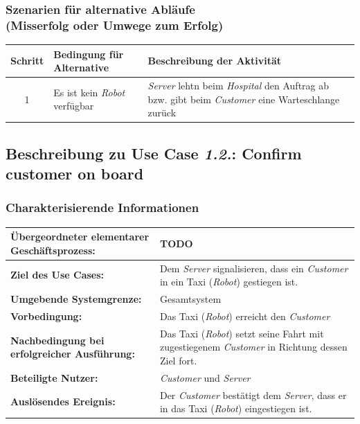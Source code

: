 			\subsubsection*{Szenarien für alternative Abläufe\\ (Misserfolg oder Umwege zum Erfolg)}	
					
			\begin{table}[H]
					\centering
					\begin{tabularx}{\textwidth}{|c|p{2cm}|X|}
					\hline
					Schritt & Bedingung für Alternative & Beschreibung der Aktivität \\ \hline
					1 & Es ist kein \emph{Robot} verfügbar & \emph{Server} lehtn beim \emph{Hospital} den Auftrag ab bzw. gibt beim \emph{Customer} eine Warteschlange zurück \\
					\hline
					\end{tabularx}
				\end{table}
				
				
			
			
		
			
			\pagebreak
	
			\subsection*{Beschreibung zu Use Case \emph{1.2.}: Confirm customer on board}
				\subsubsection*{Charakterisierende Informationen}
				
				\begin{table}[H]
					\centering
					\begin{tabularx}{\textwidth}{|p{5cm}|X|}
						\hline
						\textbf{Übergeordneter elementarer Geschäftsprozess:} & TODO  \\ \hline
						\textbf{Ziel des Use Cases:} & Dem \emph{Server} signalisieren, dass ein \emph{Customer} in ein Taxi (\emph{Robot}) gestiegen ist. \\ \hline
						\textbf{Umgebende Systemgrenze:} & Gesamtsystem \\ \hline
						\textbf{Vorbedingung:} & Das Taxi (\emph{Robot}) erreicht den \emph {Customer} \\ \hline
						\textbf{Nachbedingung bei erfolgreicher Ausführung:} & Das Taxi (\emph{Robot}) setzt seine Fahrt mit zugestiegenem \emph{Customer} in Richtung dessen Ziel fort. \\ \hline
						\textbf{Beteiligte Nutzer:} & \emph{Customer} und \emph{Server} \\ \hline
						\textbf{Auslösendes Ereignis:} & Der \emph{Customer} bestätigt dem \emph{Server}, dass er in das Taxi (\emph{Robot}) eingestiegen ist. \\
						\hline
					\end{tabularx}
				\end{table}
				
